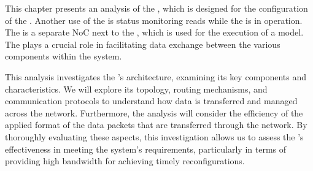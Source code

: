 This chapter presents an analysis of the \confignoc{}, which is designed for the configuration of the \graicore{}.
Another use of the \confignoc{} is status monitoring reads while the \graicore{} is in operation.
The \confignoc{} is a separate NoC next to the \eventnoc{}, which is used for the execution of a model.
The \confignoc{} plays a crucial role in facilitating data exchange between the various components within the system.

This analysis investigates the \confignoc{}'s architecture, examining its key components and characteristics.
We will explore its topology, routing mechanisms, and communication protocols to understand how data is transferred and managed across the network.
Furthermore, the analysis will consider the efficiency of the applied format of the data packets that are transferred through the network.  
By thoroughly evaluating these aspects, this investigation allows us to assess the \confignoc{}'s effectiveness in meeting the system's requirements, particularly in terms of providing high bandwidth for achieving timely reconfigurations.


